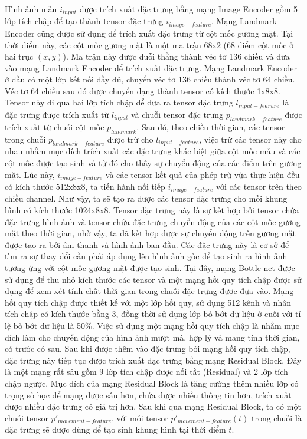 Hình ảnh mẫu $i_{input}$ được trích xuất đặc trưng bằng mạng Image Encoder gồm 5 lớp tích chập để tạo thành tensor đặc trưng $i_{image-feature}$. Mạng Landmark Encoder cũng được sử dụng để trích xuất đặc trưng từ cột mốc gương mặt. Tại thời điểm này, các cột mốc gương mặt là một ma trận 68x2 (68 điểm cột mốc ở hai trục $(x,y)$). Ma trận này được duỗi thẳng thành véc tơ 136 chiều và đưa vào mạng Landmark Encoder để trích xuất đặc trưng. Mạng Landmark Encoder ở đầu có một lớp kết nối đầy đủ, chuyển véc tơ 136 chiều thành véc tơ 64 chiều. Véc tơ 64 chiều sau đó được chuyển dạng thành tensor có kích thước 1x8x8. Tensor này đi qua hai lớp tích chập để đưa ra tensor đặc trưng $l_{input-fearure}$ là đặc trưng được trích xuất từ $l_{input}$ và chuỗi tensor đặc trưng $p_{landmark-feature}$ được trích xuất từ chuỗi cột mốc $p_{landmark}$. Sau đó, theo chiều thời gian, các tensor trong chuỗi $p_{landmark-feature}$ được trừ cho $l_{input-feature}$, việc trừ các tensor này cho nhau nhằm mục đích trích xuất các đặc trưng khác biệt giữa cột mốc mẫu và các cột mốc được tạo sinh và từ đó cho thấy sự chuyển động của các điểm trên gương mặt. Lúc này, $i_{image-feature}$ và các tensor kết quả của phép trừ vừa thực hiện đều có kích thước 512x8x8, ta tiến hành nối tiếp $i_{image-feature}$ với các tensor trên theo chiều channel. Như vậy, ta sẽ tạo ra được các tensor đặc trưng cho mỗi khung hình có kích thước 1024x8x8. Tensor đặc trưng này là sự kết hợp bởi tensor chứa đặc trưng hình ảnh và tensor chứa đặc trưng chuyển động của các cột mốc gương mặt theo thời gian, nhờ vậy, ta đã kết hợp được sự chuyển động trên gương mặt được tạo ra bởi âm thanh và hình ảnh ban đầu. Các đặc trưng này là cơ sở để tìm ra sự thay đổi cần phải áp dụng lên hình ảnh gốc để tạo sinh ra hình ảnh tương ứng với cột mốc gương mặt được tạo sinh. Tại đây, mạng Bottle net được sử dụng để thu nhỏ kích thước các tensor và một mạng hồi quy tích chập được sử dụng để xem xét tính chất thời gian trong chuỗi đặc trưng được đưa vào. Mạng hồi quy tích chập được thiết kế với một lớp hồi quy, sử dụng 512 kênh và nhân tích chập có kích thước bằng 3, đồng thời sử dụng lớp bỏ bớt dữ liệu ở cuối với tỉ lệ bỏ bớt dữ liệu là 50\%. Việc sử dụng một mạng hồi quy tích chập là nhằm mục đích làm cho chuyển động của hình ảnh mượt mà, hợp lý và mang tính thời gian, có trước có sau. Sau khi được thêm vào đặc trưng bởi mạng hồi quy tích chập, đặc trưng này tiếp tục được trích xuất đặc trưng bằng mạng Residual Block. Đây là một mạng rất sâu gồm 9 lớp tích chập được nối tắt (Residual) và 2 lớp tích chập ngược. Mục đích của mạng Residual Block là tăng cường thêm nhiều lớp có trọng số học để mạng được sâu hơn, chứa được nhiều thông tin hơn, trích xuất được nhiều đặc trưng có giá trị hơn. Sau khi qua mạng Residual Block, ta có một chuỗi tensor $p'_{movement-feature}$, với mỗi tensor $p'_{movement-feature}(t)$ trong chuỗi là đặc trưng sẽ được dùng để tạo sinh khung hình tại thời điểm $t$.

